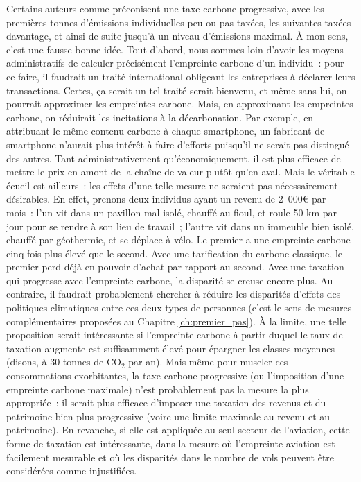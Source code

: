 \documentclass[a5paper,french]{memoir}
\begin{document}
Certains auteurs comme \cite{piketty_capital_2019} préconisent une taxe carbone progressive, avec les premières tonnes d'émissions individuelles peu ou pas taxées, les suivantes taxées davantage, et ainsi de suite jusqu'à un niveau d'émissions maximal. À mon sens, c'est une fausse bonne idée. Tout d'abord, nous sommes loin d'avoir les moyens administratifs de calculer précisément l'empreinte carbone d'un individu~: pour ce faire, il faudrait un traité international obligeant les entreprises à déclarer leurs transactions. Certes, ça serait un tel traité serait bienvenu, et même sans lui, on pourrait approximer les empreintes carbone. Mais, en approximant les empreintes carbone, on réduirait les incitations à la décarbonation. Par exemple, en attribuant le même contenu carbone à chaque smartphone, un fabricant de smartphone n'aurait plus intérêt à faire d'efforts puisqu'il ne serait pas distingué des autres. Tant administrativement qu'économiquement, il est plus efficace de mettre le prix en amont de la chaîne de valeur plutôt qu'en aval. Mais le véritable écueil est ailleurs~: les effets d'une telle mesure ne seraient pas nécessairement désirables. En effet, prenons deux individus ayant un revenu de 2~000\euro{} par mois~: l'un vit dans un pavillon mal isolé, chauffé au fioul, et roule 50 km par jour pour se rendre à son lieu de travail~; l'autre vit dans un immeuble bien isolé, chauffé par géothermie, et se déplace à vélo. Le premier a une empreinte carbone cinq fois plus élevé que le second. Avec une tarification du carbone classique, le premier perd déjà en pouvoir d'achat par rapport au second. Avec une taxation qui progresse avec l'empreinte carbone, la disparité se creuse encore plus. Au contraire, il faudrait probablement chercher à réduire les disparités d'effets des politiques climatiques entre ces deux types de personnes (c'est le sens de mesures complémentaires proposées au Chapitre \ref{ch:premier_pas}). À la limite, une telle proposition serait intéressante si l'empreinte carbone à partir duquel le taux de taxation augmente est suffisamment élevé pour épargner les classes moyennes (disons, à 30 tonnes de CO$_\text{2}$ par an). Mais même pour museler ces consommations exorbitantes, la taxe carbone progressive (ou l'imposition d'une empreinte carbone maximale) n'est probablement pas la mesure la plus appropriée~: il serait plus efficace d'imposer une taxation des revenus et du patrimoine bien plus progressive (voire une limite maximale au revenu et au patrimoine). En revanche, si elle est appliquée au seul secteur de l'aviation, cette forme de taxation est intéressante, dans la mesure où l'empreinte aviation est facilement mesurable et où les disparités dans le nombre de vols peuvent être considérées comme injustifiées. %
\end{document}
